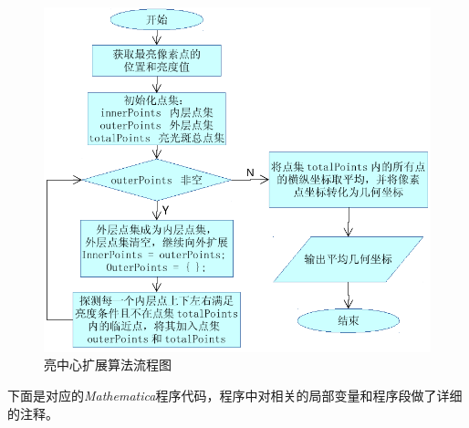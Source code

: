 \documentclass[UTF8,a4paper,12pt]{article}
\begin{document}
\begin{figure}[htbp]
\centering
\includegraphics[width=140mm]{image/briPointExpand-alg.pdf}
\caption{亮中心扩展算法流程图}\label{fig:briPointExpand-alg}
\end{figure}

下面是对应的\textit{Mathematica}程序代码，程序中对相关的局部变量和程序段做了详细的注释。
\end{document}
